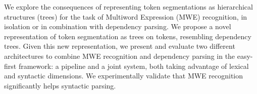 We explore the consequences of representing token segmentations as hierarchical structures (trees) for the task of Multiword Expression (MWE) recognition, in isolation or in combination with dependency parsing. We propose a novel representation of token segmentation as trees on tokens, resembling dependency trees. Given this new representation, we present and evaluate two different architectures to combine MWE recognition and dependency parsing in the easy-first framework: a pipeline and a joint system, both taking advantage of lexical and syntactic dimensions. We experimentally validate that MWE recognition significantly helps syntactic parsing.
